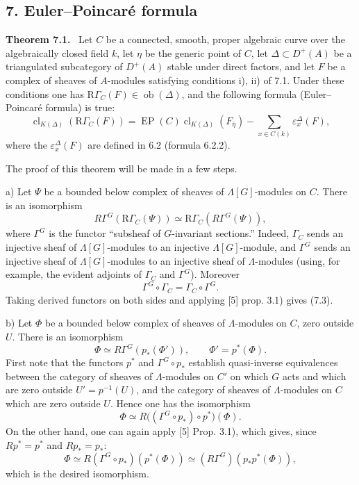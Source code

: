 \documentclass[11pt]{article}
\newenvironment{statement}[1]{\par\medskip\noindent\textbf{#1.}\ }{\par\medskip}
\providecommand{\EP}{\operatorname{EP}}
\providecommand{\Ob}{\operatorname{ob}}
\providecommand{\Ob}{\operatorname{ob}}
\providecommand{\EP}{\operatorname{EP}}
\providecommand{\Ob}{\operatorname{Ob}}
\providecommand{\clK}[1]{\operatorname{cl}_{K(#1)}}
\providecommand{\RG}{\mathrm R\Gamma}
\providecommand{\Ob}{\operatorname{ob}}
\providecommand{\Ob}{\operatorname{Ob}}
\begin{document}
\subsection*{7. Euler--Poincaré formula}

\begin{statement}{Theorem 7.1}
Let $C$ be a connected, smooth, proper algebraic curve over the algebraically closed field $k$, let $\eta$ be the generic point of $C$, let $\Delta\subset D^+(A)$ be a triangulated subcategory of $D^+(A)$ stable under direct factors, and let $F$ be a complex of sheaves of $A$-modules satisfying conditions i), ii) of 7.1. Under these conditions one has $\RG_C(F)\in\Ob(\Delta)$, and the following formula (Euler--Poincaré formula) is true:
\[
\clK{\Delta}(\RG_C(F))
=
\EP(C)\clK{\Delta}(F_{\bar\eta})
-\sum_{x\in C(k)}\varepsilon_x^\Delta(F),
\tag{7.2}
\]
where the $\varepsilon_x^\Delta(F)$ are defined in 6.2 (formula 6.2.2).
\end{statement}

The proof of this theorem will be made in a few steps.

a) Let $\Psi$ be a bounded below complex of sheaves of $\Lambda[G]$-modules on $C$. There is an isomorphism
\[
R\Gamma^G(\RG_C(\Psi))\simeq\RG_C(R\Gamma^G(\Psi)),
\tag{7.3}
\]
where $\Gamma^G$ is the functor ``subsheaf of $G$-invariant sections.'' Indeed, $\Gamma_C$ sends an injective sheaf of $\Lambda[G]$-modules to an injective $\Lambda[G]$-module, and $\Gamma^G$ sends an injective sheaf of $\Lambda[G]$-modules to an injective sheaf of $\Lambda$-modules (using, for example, the evident adjoints of $\Gamma_C$ and $\Gamma^G$). Moreover
\[
\Gamma^G\circ\Gamma_C=\Gamma_C\circ\Gamma^G.
\]
Taking derived functors on both sides and applying [5] prop. 3.1) gives (7.3).

b) Let $\Phi$ be a bounded below complex of sheaves of $\Lambda$-modules on $C$, zero outside $U$. There is an isomorphism
\[
\Phi\simeq R\Gamma^G(p_*(\Phi')),
\qquad \Phi'=p^*(\Phi).
\tag{7.4}
\]
First note that the functors $p^*$ and $\Gamma^G\circ p_*$ establish quasi-inverse equivalences between the category of sheaves of $\Lambda$-modules on $C'$ on which $G$ acts and which are zero outside $U'=p^{-1}(U)$, and the category of sheaves of $\Lambda$-modules on $C$ which are zero outside $U$. Hence one has the isomorphism
\[
\Phi\simeq R\bigl((\Gamma^G\circ p_*)\circ p^*\bigr)(\Phi).
\]
On the other hand, one can again apply [5] Prop. 3.1), which gives, since $Rp^*=p^*$ and $Rp_*=p_*$:
\[
\Phi\simeq R(\Gamma^G\circ p_*)(p^*(\Phi))
\simeq (R\Gamma^G)(p_*p^*(\Phi)),
\]
which is the desired isomorphism.
\end{document}
